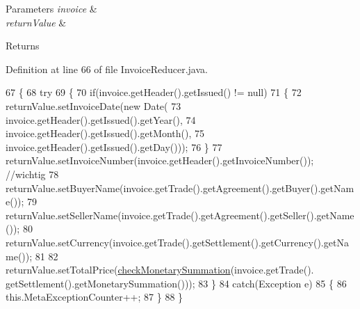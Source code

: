 \begin{DoxyParams}{Parameters}
{\em invoice} & \\
\hline
{\em return\+Value} & \\
\hline
\end{DoxyParams}
\begin{DoxyReturn}{Returns}

\end{DoxyReturn}


Definition at line 66 of file Invoice\+Reducer.\+java.


\begin{DoxyCode}
67     \{
68         \textcolor{keywordflow}{try}
69         \{
70             \textcolor{keywordflow}{if}(invoice.getHeader().getIssued() != null)
71             \{
72                 returnValue.setInvoiceDate(\textcolor{keyword}{new} Date(
73                         invoice.getHeader().getIssued().getYear(), 
74                         invoice.getHeader().getIssued().getMonth(), 
75                         invoice.getHeader().getIssued().getDay()));
76             \}
77             returnValue.setInvoiceNumber(invoice.getHeader().getInvoiceNumber());  \textcolor{comment}{//wichtig}
78             returnValue.setBuyerName(invoice.getTrade().getAgreement().getBuyer().getName());
79             returnValue.setSellerName(invoice.getTrade().getAgreement().getSeller().getName());
80             returnValue.setCurrency(invoice.getTrade().getSettlement().getCurrency().getName());
81             
82             returnValue.setTotalPrice(\hyperlink{class_reduced_invoice_1_1_invoice_reducer_a6caff41f142502c44cbeefc7b1e44c9d}{checkMonetarySummation}(invoice.getTrade().
      getSettlement().getMonetarySummation())); 
83         \}
84         \textcolor{keywordflow}{catch}(Exception e)
85         \{
86             this.MetaExceptionCounter++;
87         \}
88     \}
\end{DoxyCode}

